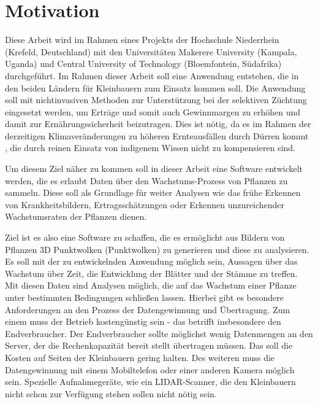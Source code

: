 \documentclass[12pt,titlepage, twoside]{article}
\begin{document}
\pagestyle{plain}
\tableofcontents
\newpage

\renewcommand{\labelenumi}{\alph{enumi})} 



\section{Motivation}
\label{sec:einleitung}
Diese Arbeit wird im Rahmen eines Projekts der Hochschule Niederrhein (Krefeld, Deutschland) mit den Universitäten Makerere University (Kampala, Uganda) und Central University of Technology (Bloemfontein, Südafrika) durchgeführt.
Im Rahmen dieser Arbeit soll eine Anwendung entstehen, die in den beiden Ländern für Kleinbauern zum Einsatz kommen soll.
Die Anwendung soll mit nichtinvasiven Methoden zur Unterstützung bei der selektiven Züchtung eingesetzt werden, um Erträge und somit auch Gewinnmargen zu erhöhen und damit zur Ernährungssicherheit beizutragen.
Dies ist nötig, da es im Rahmen der derzeitigen Klimaveränderungen zu höheren Ernteausfällen durch Dürren kommt \cite{droughts}, die durch reinen Einsatz von indigenem Wissen nicht zu kompensieren sind.

Um diesem Ziel näher zu kommen soll in dieser Arbeit eine Software entwickelt werden, die es erlaubt Daten über den Wachstums-Prozess von Pflanzen zu sammeln. 
Diese soll als Grundlage für weiter Analysen wie das frühe Erkennen von Krankheitsbildern, Ertragsschätzungen oder Erkennen unzureichender Wachstumsraten der Pflanzen dienen.

Ziel ist es also eine Software zu schaffen, die es ermöglicht aus Bildern von Pflanzen 3D Punktwolken (Punktwolken) zu generieren und diese zu analysieren.
Es soll mit der zu entwickelnden Anwendung möglich sein, Aussagen über das Wachstum über Zeit, die Entwicklung der Blätter und der Stämme zu treffen. 
Mit diesen Daten sind Analysen möglich, die auf das Wachstum einer Pflanze unter bestimmten Bedingungen schließen lassen.
Hierbei gibt es besondere Anforderungen an den Prozess der Datengewinnung und Übertragung. Zum einem muss der Betrieb kostengünstig sein - das betrifft insbesondere den Endverbraucher.
Der Endverbraucher sollte möglichst wenig Datenmengen an den Server, der die Rechenkapazität bereit stellt übertragen müssen. Das soll die Kosten auf Seiten der Kleinbauern gering halten.
Des weiteren muss die Datengewinnung mit einem Mobiltelefon oder einer anderen Kamera möglich sein. 
Spezielle Aufnahmegeräte, wie ein LIDAR-Scanner, die den Kleinbauern nicht schon zur Verfügung stehen sollen nicht nötig sein.
\end{document}
